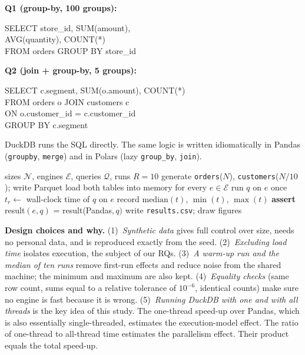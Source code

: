 \documentclass[conference,a4paper]{IEEEtran}
\begin{document}
\smallskip\noindent\textbf{Q1 (group-by, 100 groups):}\\
{\footnotesize\ttfamily\raggedright SELECT store\_id, SUM(amount),\\ \hspace*{1em}AVG(quantity), COUNT(*)\\ \hspace*{1em}FROM orders GROUP BY store\_id\par}

\smallskip\noindent\textbf{Q2 (join + group-by, 5 groups):}\\
{\footnotesize\ttfamily\raggedright SELECT c.segment, SUM(o.amount), COUNT(*)\\ \hspace*{1em}FROM orders o JOIN customers c\\ \hspace*{1em}ON o.customer\_id = c.customer\_id\\ \hspace*{1em}GROUP BY c.segment\par}
\smallskip

DuckDB runs the SQL directly. The same logic is written idiomatically in Pandas (\texttt{groupby}, \texttt{merge}) and in Polars (lazy \texttt{group\_by}, \texttt{join}).

\begin{algorithm}[t]
\caption{Benchmark harness}
\label{alg:harness}
\begin{algorithmic}[1]
\Require sizes $\mathcal{N}$, engines $\mathcal{E}$, queries $\mathcal{Q}$, runs $R{=}10$
  \State generate \texttt{orders}($N$), \texttt{customers}($N/10$); write Parquet
  \State load both tables into memory for every $e \in \mathcal{E}$
    \State run $q$ on $e$ once 
      \State $t_r \gets$ wall-clock time of $q$ on $e$
    \EndFor
    \State record $\mathrm{median}(t)$, $\min(t)$, $\max(t)$
    \State \textbf{assert} result$(e,q)$ = result(Pandas$,q)$
  \EndFor
\EndFor
\State write \texttt{results.csv}; draw figures
\end{algorithmic}
\end{algorithm}

\textbf{Design choices and why.} (1)~\emph{Synthetic data} gives full control over size, needs no personal data, and is reproduced exactly from the seed. (2)~\emph{Excluding load time} isolates execution, the subject of our RQs. (3)~\emph{A warm-up run and the median of ten runs} remove first-run effects and reduce noise from the shared machine; the minimum and maximum are also kept. (4)~\emph{Equality checks} (same row count, sums equal to a relative tolerance of $10^{-6}$, identical counts) make sure no engine is fast because it is wrong. (5)~\emph{Running DuckDB with one and with all threads} is the key idea of this study. The one-thread speed-up over Pandas, which is also essentially single-threaded, estimates the execution-model effect. The ratio of one-thread to all-thread time estimates the parallelism effect. Their product equals the total speed-up.
\end{document}

